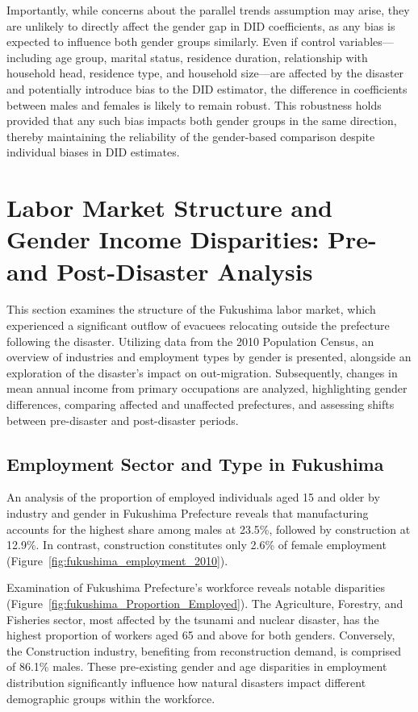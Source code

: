 \documentclass[a4paper,12pt]{article}
\begin{document}
Importantly, while concerns about the parallel trends assumption may arise, they are unlikely to directly affect the gender gap in DID coefficients, as any bias is expected to influence both gender groups similarly. Even if control variables—including age group, marital status, residence duration, relationship with household head, residence type, and household size—are affected by the disaster and potentially introduce bias to the DID estimator, the difference in coefficients between males and females is likely to remain robust. This robustness holds provided that any such bias impacts both gender groups in the same direction, thereby maintaining the reliability of the gender-based comparison despite individual biases in DID estimates.

\section{Labor Market Structure and Gender Income Disparities: Pre- and Post-Disaster Analysis}

This section examines the structure of the Fukushima labor market, which experienced a significant outflow of evacuees relocating outside the prefecture following the disaster. Utilizing data from the 2010 Population Census, an overview of industries and employment types by gender is presented, alongside an exploration of the disaster's impact on out-migration. Subsequently, changes in mean annual income from primary occupations are analyzed, highlighting gender differences, comparing affected and unaffected prefectures, and assessing shifts between pre-disaster and post-disaster periods.

\subsection{Employment Sector and Type in Fukushima}

An analysis of the proportion of employed individuals aged 15 and older by industry and gender in Fukushima Prefecture reveals that manufacturing accounts for the highest share among males at 23.5\%, followed by construction at 12.9\%. In contrast, construction constitutes only 2.6\% of female employment (Figure~\ref{fig:fukushima_employment_2010}).

Examination of Fukushima Prefecture's workforce reveals notable disparities (Figure~\ref{fig:fukushima_Proportion_Employed}). The Agriculture, Forestry, and Fisheries sector, most affected by the tsunami and nuclear disaster, has the highest proportion of workers aged 65 and above for both genders. Conversely, the Construction industry, benefiting from reconstruction demand, is comprised of 86.1\% males. These pre-existing gender and age disparities in employment distribution significantly influence how natural disasters impact different demographic groups within the workforce.
\end{document}
